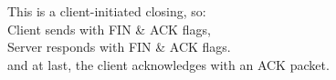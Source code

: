 This is a client-initiated closing, so:\\
Client sends with FIN \& ACK flags,\\
Server responds with FIN \& ACK flags.\\ 
and at last, the client acknowledges with an ACK packet.